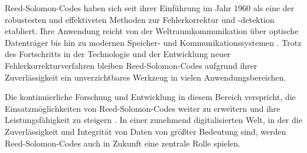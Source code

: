 Reed-Solomon-Codes haben sich seit ihrer Einführung im Jahr 1960 als eine der robustesten und effektivsten Methoden zur Fehlerkorrektur und -detektion etabliert. 
Ihre Anwendung reicht von der Weltraumkommunikation über optische Datenträger bis hin zu modernen Speicher- und Kommunikationssystemen \cite{wickerReedSolomonCodes1994}. 
Trotz des Fortschritts in der Technologie und der Entwicklung neuer Fehlerkorrekturverfahren bleiben Reed-Solomon-Codes aufgrund ihrer Zuverlässigkeit ein unverzichtbares Werkzeug in vielen Anwendungsbereichen.

Die kontinuierliche Forschung und Entwicklung in diesem Bereich verspricht, die Einsatzmöglichkeiten von Reed-Solomon-Codes weiter zu erweitern und ihre Leistungsfähigkeit zu steigern \cite{conOptimalTwoDimensionalReed2024, sippelReedSolomonCodes2019}. 
In einer zunehmend digitalisierten Welt, in der die Zuverlässigkeit und Integrität von Daten von größter Bedeutung sind, werden Reed-Solomon-Codes auch in Zukunft eine zentrale Rolle spielen.